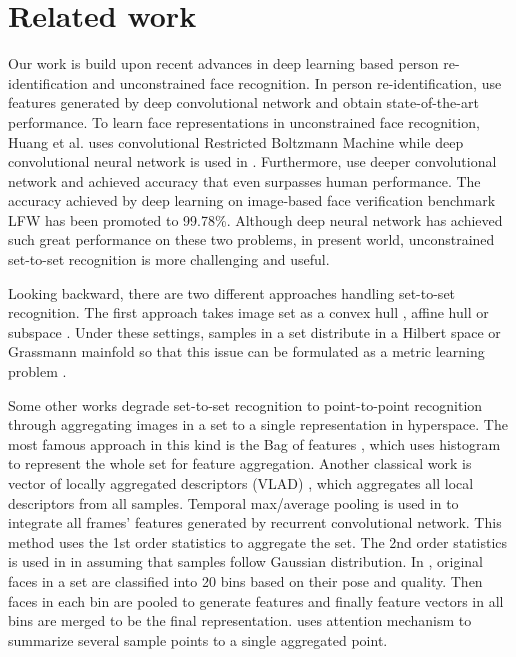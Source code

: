 \documentclass[10pt,twocolumn,letterpaper]{article}
\begin{document}
 \section{Related work}

Our work is build upon recent advances in deep learning based person re-identification and unconstrained face recognition.  In person re-identification, \cite{li2014deepreid,xiao2016learning,zheng2016mars} use features generated by deep convolutional network and obtain state-of-the-art performance.  To learn face representations in unconstrained face recognition, Huang et al. \cite{Huang2012Learning} uses convolutional Restricted Boltzmann Machine while deep convolutional neural network is used  in \cite{taigman2014deepface, sun2014deep1}. Furthermore,  \cite{sun2015deeply,schroff2015facenet} use deeper convolutional network and achieved accuracy that even surpasses human performance. The accuracy achieved by deep learning on image-based face verification benchmark LFW\cite{learnedlabeled} has been promoted to 99.78\%. Although deep neural network has achieved such great performance on these two problems, in present world, unconstrained set-to-set recognition is more challenging and useful.


Looking backward, there are two different approaches handling set-to-set recognition. The first approach takes image set as a convex hull \cite{cevikalp2010face}, affine hull \cite{hu2011sparse} or subspace \cite{basri2011approximate, Huang2015Projection}. Under these settings, samples in a set distribute in a Hilbert space or Grassmann mainfold so that this issue can be formulated as a metric learning problem \cite{lu2015multi,yang2013face}.

Some other works degrade set-to-set recognition to point-to-point recognition through aggregating images in a set to a single representation in hyperspace. The most famous approach in this kind is the Bag of features \cite{lazebnik2006beyond}, which uses histogram to represent the whole set for feature aggregation. Another classical work is vector of locally aggregated descriptors (VLAD) \cite{jegou2010aggregating}, which aggregates all local descriptors from all samples. Temporal max/average pooling is used in \cite{wu2016deep} to integrate all frames' features generated by recurrent convolutional network. This method uses the 1st order statistics to aggregate the set. The 2nd order statistics is used in \cite{wang2012covariance, Zhu2013From} in assuming that samples follow Gaussian distribution. In \cite{hassner2016pooling}, original faces in a set are classified into 20 bins based on their pose and quality. Then faces in each bin are pooled to generate features and finally feature vectors in all bins are merged to be the final representation. \cite{yang2016neural} uses attention mechanism to summarize several sample points to a single aggregated point. 
\end{document}
